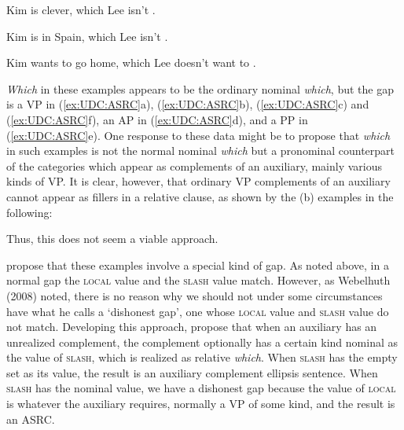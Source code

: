 \documentclass[output=paper
                ,modfonts
                ,nonflat
	        ,collection
	        ,collectionchapter
	        ,collectiontoclongg
 	        ,biblatex
                ,babelshorthands
                ,newtxmath
                ,draftmode
                ,colorlinks, citecolor=brown
]{./langsci/langscibook}
\begin{document}
{\begin{exe}
\begin{xlist}
    \ex Kim is clever, which Lee isn't \gap{}.
    
    \ex Kim is in Spain, which Lee isn't \gap{}.
    
    \ex Kim wants to go home, which Lee doesn't want to \gap{}.
  \end{xlist}
\end{exe}

\noindent
\emph{Which} in these examples appears to be the ordinary nominal
\emph{which}, but the gap is a VP in (\ref{ex:UDC:ASRC}a), (\ref{ex:UDC:ASRC}b), (\ref{ex:UDC:ASRC}c) and (\ref{ex:UDC:ASRC}f), an AP in
(\ref{ex:UDC:ASRC}d), and a PP in (\ref{ex:UDC:ASRC}e). One response to these data might be to propose
that \emph{which} in such examples is not the normal nominal
\emph{which} but a pronominal counterpart of the categories which appear
as complements of an auxiliary, mainly various kinds of VP. It is clear,
however, that ordinary VP complements of an auxiliary cannot appear as
fillers in a relative clause, as shown by the (b) examples in the
following:

\begin{exe} \ex \begin{xlist} 

\end{xlist}
\end{exe}

\begin{exe} \ex \begin{xlist} 

\end{xlist}
\end{exe}
\noindent
\begin{exe} \ex \begin{xlist} 

\end{xlist}
\end{exe}

\noindent
Thus, this does not seem a viable approach.

\citet{Arnold:Borsley:10} propose that these examples involve a special
kind of gap. As noted above, in a normal gap the \textsc{local} value and the
\textsc{slash} value match. However, as Webelhuth (2008) noted, there is no
reason why we should not under some circumstances have what he calls a
`dishonest gap', one whose \textsc{local} value and \textsc{slash} value do not match.
Developing this approach, \citet{Arnold:Borsley:10} propose that when an
auxiliary has an unrealized complement, the complement optionally has a
certain kind nominal as the value of \textsc{slash}, which is realized as
relative \emph{which}. When \textsc{slash} has the empty set as its value, the
result is an auxiliary complement ellipsis sentence. When \textsc{slash} has the
nominal value, we have a dishonest gap because the value of \textsc{local} is
whatever the auxiliary requires, normally a VP of some kind, and the
result is an ASRC.

}
\end{document}
